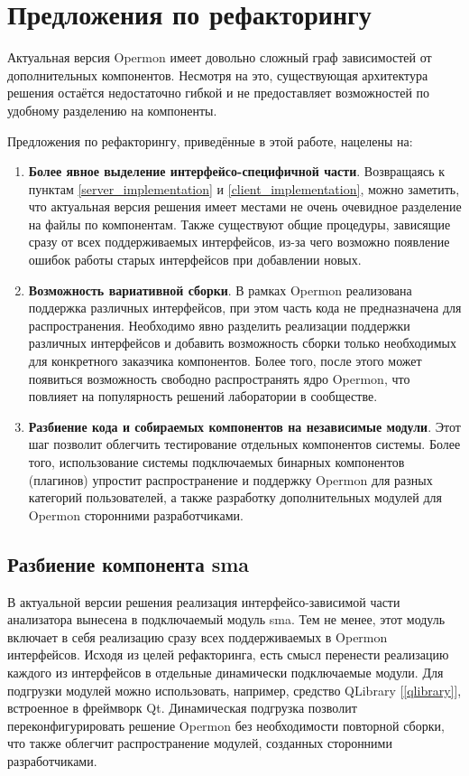 \section{Предложения по рефакторингу}

Актуальная версия Opermon имеет довольно сложный граф зависимостей от дополнительных компонентов. Несмотря на это, существующая архитектура решения остаётся недостаточно гибкой и не предоставляет возможностей по удобному разделению на компоненты.

Предложения по рефакторингу, приведённые в этой работе, нацелены на:

\begin{enumerate}
 \item \textbf{Более явное выделение интерфейсо-специфичной части}. Возвращаясь к пунктам \ref{server_implementation} и \ref{client_implementation}, можно заметить, что актуальная версия решения имеет местами не очень очевидное разделение на файлы по компонентам. Также существуют общие процедуры, зависящие сразу от всех поддерживаемых интерфейсов, из-за чего возможно появление ошибок работы старых интерфейсов при добавлении новых.
 \item \textbf{Возможность вариативной сборки}. В рамках Opermon реализована поддержка различных интерфейсов, при этом часть кода не предназначена для распространения. Необходимо явно разделить реализации поддержки различных интерфейсов и добавить возможность сборки только необходимых для конкретного заказчика компонентов. Более того, после этого может появиться возможность свободно распространять ядро Opermon, что повлияет на популярность решений лаборатории в сообществе.
 \item \textbf{Разбиение кода и собираемых компонентов на независимые модули}. Этот шаг позволит облегчить тестирование отдельных компонентов системы. Более того, использование системы подключаемых бинарных компонентов (плагинов) упростит распространение и поддержку Opermon для разных категорий пользователей, а также разработку дополнительных модулей для Opermon сторонними разработчиками.
\end{enumerate}

\subsection{Разбиение компонента sma}

В актуальной версии решения реализация интерфейсо-зависимой части анализатора вынесена в подключаемый модуль sma. Тем не менее, этот модуль включает в себя реализацию сразу всех поддерживаемых в Opermon интерфейсов. Исходя из целей рефакторинга, есть смысл перенести реализацию каждого из интерфейсов в отдельные динамически подключаемые модули. Для подгрузки модулей можно использовать, например, средство QLibrary [\ref{qlibrary}], встроенное в фреймворк Qt. Динамическая подгрузка позволит переконфигурировать решение Opermon без необходимости повторной сборки, что также облегчит распространение модулей, созданных сторонними разработчиками.

